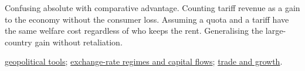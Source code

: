 \begin{qfmethod}
 Confusing absolute with comparative advantage. Counting tariff revenue as a gain to the economy without the consumer loss. Assuming a quota and a tariff have the same welfare cost regardless of who keeps the rent. Generalising the large-country gain without retaliation.

 \hyperref[def:geopolitics-institutions-tools]{geopolitical tools}; \hyperref[def:exchange-rate-regimes-capital-flows]{exchange-rate regimes and capital flows}; \hyperref[def:growth-policies-technology-trade]{trade and growth}.

\end{qfmethod}
